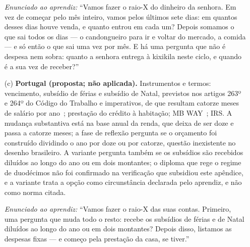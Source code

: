\begin{enumerate}
\noindent\textit{Enunciado ao aprendiz:} ``Vamos fazer o raio-X do dinheiro da senhora. Em vez de começar pelo mês inteiro, vamos pelos últimos sete dias: em quantos desses dias houve venda, e quanto entrou em cada um? Depois somamos o que sai todos os dias --- o candongueiro para ir e voltar do mercado, a comida --- e só então o que sai uma vez por mês. E há uma pergunta que não é despesa nem sobra: quanto a senhora entrega à kixikila neste ciclo, e quando é a sua vez de receber?''

\item[(c)] \textbf{Portugal (proposta; não aplicada).} Instrumentos e termos: vencimento, subsídio de férias e subsídio de Natal, previstos nos artigos 263º e 264º do Código do Trabalho e imperativos, de que resultam catorze meses de salário por ano~\cite{ct2009}; prestação do crédito à habitação; MB WAY~\cite{sibs_mbway}; IRS. A mudança substantiva está na base anual da renda, que deixa de ser doze e passa a catorze meses; a fase de reflexão pergunta se o orçamento foi construído dividindo o ano por doze ou por catorze, questão inexistente no desenho brasileiro. A variante pergunta também se os subsídios são recebidos diluídos ao longo do ano ou em dois montantes; o diploma que rege o regime de duodécimos não foi confirmado na verificação que subsidiou este apêndice, e a variante trata a opção como circunstância declarada pelo aprendiz, e não como norma citada.

\noindent\textit{Enunciado ao aprendiz:} ``Vamos fazer o raio-X das suas contas. Primeiro, uma pergunta que muda todo o resto: recebe os subsídios de férias e de Natal diluídos ao longo do ano ou em dois montantes? Depois disso, listamos as despesas fixas --- e começo pela prestação da casa, se tiver.''
\end{enumerate}

